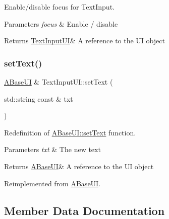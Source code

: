 Enable/disable focus for Text\+Input. 


\begin{DoxyParams}{Parameters}
{\em focus} & Enable / disable \\
\hline
\end{DoxyParams}
\begin{DoxyReturn}{Returns}
\hyperlink{class_text_input_u_i}{Text\+Input\+UI}\& A reference to the UI object 
\end{DoxyReturn}
\mbox{\label{class_text_input_u_i_a2897827565bcb1d849cd36d3c9baf7a9}} 
\subsubsection{\texorpdfstring{set\+Text()}{setText()}}
{\footnotesize\ttfamily \hyperlink{class_a_base_u_i}{A\+Base\+UI} \& Text\+Input\+U\+I\+::set\+Text (\begin{DoxyParamCaption}\item[{std\+::string const \&}]{txt }\end{DoxyParamCaption})\hspace{0.3cm}{\ttfamily [virtual]}}



Redefinition of \hyperlink{class_a_base_u_i_a82e182bfd577d37224aa49be3f64ac87}{A\+Base\+U\+I\+::set\+Text} function. 


\begin{DoxyParams}{Parameters}
{\em txt} & The new text \\
\hline
\end{DoxyParams}
\begin{DoxyReturn}{Returns}
\hyperlink{class_a_base_u_i}{A\+Base\+UI}\& A reference to the UI object 
\end{DoxyReturn}


Reimplemented from \hyperlink{class_a_base_u_i_a82e182bfd577d37224aa49be3f64ac87}{A\+Base\+UI}.



\subsection{Member Data Documentation}
\mbox{\label{class_text_input_u_i_a06b223f0059aafca03f51dbe516f7fc7}} 
